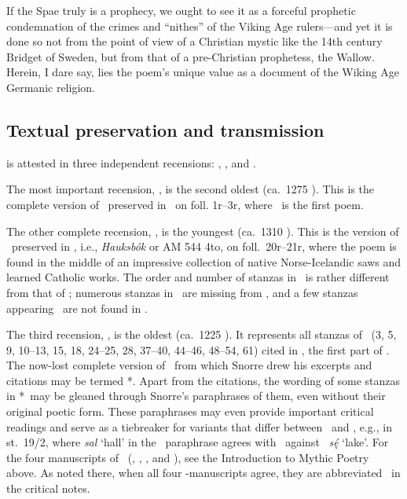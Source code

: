 If the Spae truly is a prophecy, we ought to see it as a forceful prophetic condemnation of the crimes and “nithes” of the Viking Age rulers---and yet it is done so not from the point of view of a Christian mystic like the 14th century Bridget of Sweden, but from that of a pre-Christian prophetess, the Wallow.  Herein, I dare say, lies the poem’s unique value as a document of the Wiking Age Germanic religion.

\subsection{Textual preservation and transmission}

 is attested in three independent recensions: \Regius, \Hauksbok, and \GylfMS.

The most important recension, \Regius, is the second oldest (ca.~1275 \ce).  This is the complete version of \Voluspa\ preserved in \Regius\ on foll. 1r--3r, where \Voluspa\ is the first poem.

The other complete recension, \Hauksbok, is the youngest (ca.~1310 \ce).  This is the version of \Voluspa\ preserved in \Hauksbok, i.e., \emph{Hauksbók} or AM 544 4to, on foll.~20r--21r, where the poem is found in the middle of an impressive collection of native Norse-Icelandic saws and learned Catholic works.  The order and number of stanzas in \Hauksbok\ is rather different from that of \Regius; numerous stanzas in \Regius\ are missing from \Hauksbok, and a few stanzas appearing \Hauksbok\ are not found in \Regius.

The third recension, \GylfMS, is the oldest (ca.~1225 \ce).  It represents all stanzas of \Voluspa\ (3, 5, 9, 10--13, 15, 18, 24--25, 28, 37--40, 44--46, 48--54, 61) cited in \Gylfaginning, the first part of \SnorraEdda.  The now-lost complete version of \Voluspa\ from which Snorre drew his excerpts and citations may be termed *\GylfMS.
Apart from the citations, the wording of some stanzas in *\GylfMS\ may be gleaned through Snorre’s paraphrases of them, even without their original poetic form.  These paraphrases may even provide important critical readings and serve as a tiebreaker for variants that differ between \Regius\ and \Hauksbok, e.g., in st.~19/2, where \emph{sal} ‘hall’ in the \Gylfaginning\ paraphrase agrees with \Hauksbok\ against \Regius\ \emph{sę́} ‘lake’.  For the four manuscripts of \Gylfaginning\ (\RegiusProse, \Trajectinus, \Wormianus, and \Upsaliensis), see the Introduction to Mythic Poetry above.  As noted there, when all four \Gylfaginning-manuscripts agree, they are abbreviated \GylfMS\ in the critical notes.

